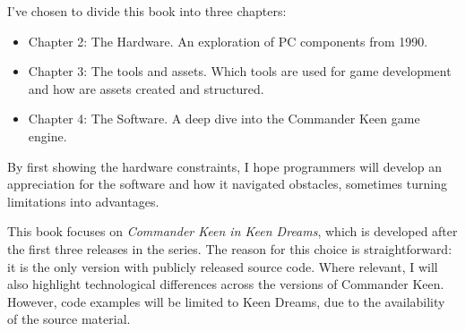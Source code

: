 \par
I've chosen to divide this book into three chapters:
\begin{itemize}
  \item Chapter 2: The Hardware. An exploration of PC components from 1990.
  \item Chapter 3: The tools and assets. Which tools are used for game development and how are assets created and structured.
  \item Chapter 4: The Software. A deep dive into the Commander Keen game engine.

\end{itemize}
By first showing the hardware constraints, I hope programmers will develop an appreciation for the software and how it navigated obstacles, sometimes turning limitations into advantages.\\

\par
This book focuses on \textit{Commander Keen in Keen Dreams}, which is developed after the first three releases in the series. The reason for this choice is straightforward: it is the only version with publicly released source code. Where relevant, I will also highlight technological differences across the versions of Commander Keen. However, code examples will be limited to Keen Dreams, due to the availability of the source material.\\





